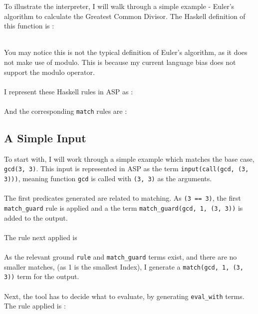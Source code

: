 To illustrate the interpreter, I will walk through a simple example - Euler's algorithm to calculate the Greatest Common Divisor. The Haskell definition of this function is :

 
\mbox{} \\
You may notice this is not the typical definition of Euler's algorithm, as it does not make use of modulo. This is because my current language bias does not support the modulo operator. \\ \\
I represent these Haskell rules in ASP as :\\

 
\mbox{} \\
And the corresponding \lstinline{match} rules are :\\ %

 

\subsection{A Simple Input}
To start with, I will work through a simple example which matches the base case, \lstinline{gcd(3, 3)}. This input is represented in ASP as the term \lstinline{input(call(gcd, (3, 3)))}, meaning function \lstinline{gcd} is called with \lstinline{(3, 3)} as the arguments. \\ \\
The first predicates generated are related to matching. As \lstinline{(3 == 3)}, the first \lstinline{match_guard} rule is applied and a the term \lstinline{match_guard(gcd, 1, (3, 3))} is added to the output.\\ \\ %
The rule next applied is \\


\mbox{} \\
As the relevant ground \lstinline{rule} and \lstinline{match_guard} terms exist, and there are no smaller matches, (as 1 is the smallest Index), I generate a \lstinline{match(gcd, 1, (3, 3))} term for the output. \\ \\ %
Next, the tool has to decide what to evaluate, by generating \lstinline{eval_with} terms. The rule applied is :\\ %


